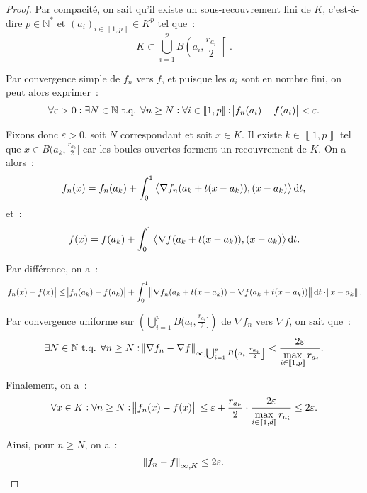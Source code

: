 \documentclass{report}
\theoremstyle{definition}
\theoremstyle{remark}
\numberwithin{equation}{section}
\newcommand{\N}{\mathbb N}
\newcommand{\tq}{\text{ t.q. }}
\newcommand{\intint}[2]{\left\llbracket#1, #2\right\rrbracket}
\newcommand{\scpr}[2]{\left\langle #1, #2\right\rangle}
\begin{document}
\begin{proof}
			Par compacité, on sait qu'il existe un sous-recouvrement fini de $K$, c'est-à-dire $p \in \N^*$ et $(a_i)_{i \in \intint 1p} \in K^p$ tel que~:
			\begin{equation}
				K \subset \bigcup_{i=1}^pB\left(a_i, \frac {r_{a_i}}2\right[.
			\end{equation}

			Par convergence simple de $f_n$ vers $f$, et puisque les $a_i$ sont en nombre fini, on peut alors exprimer~:
			\begin{equation}
				\forall \varepsilon > 0 : \exists N \in \N \tq \forall n \geq N : \forall i \in \intint 1p : \abs {f_n(a_i) - f(a_i)} < \varepsilon.
			\end{equation}

			Fixons donc $\varepsilon > 0$, soit $N$ correspondant et soit $x \in K$. Il existe $k \in \intint 1p$ tel que $x \in B(a_k, \frac {r_{a_k}}2[$ car
			les boules ouvertes forment un recouvrement de $K$. On a alors~:
			\begin{equation}
				f_n(x) = f_n(a_k) + \int_0^1\scpr {\nabla f_n(a_k + t(x - a_k))}{(x - a_k)}\dif t,
			\end{equation}
			et~:
			\begin{equation}
				f(x) = f(a_k) + \int_0^1\scpr {\nabla f(a_k + t(x - a_k))}{(x - a_k)}\dif t.
			\end{equation}

			Par différence, on a~:
			\begin{equation}
				\abs {f_n(x) - f(x)} \leq \abs {f_n(a_k) - f(a_k)} + \int_0^1\norm {\nabla f_n(a_k + t(x - a_k))
				- \nabla f(a_k + t(x - a_k))}\dif t \cdot \norm {x - a_k}.
			\end{equation}

			Par convergence uniforme sur $\left(\bigcup_{i=1}^pB(a_i, \frac {r_{a_i}}2]\right)$ de $\nabla f_n$ vers $\nabla f$, on sait que~:
			\begin{equation}
				\exists N \in \N \tq \forall n \geq N : \norm {\nabla f_n - \nabla f}_{\infty, \bigcup_{i=1}^pB\left(a_i, \frac {r_{a_i}}2\right]} <
				\frac {2\varepsilon}{\displaystyle \max_{i \in \intint 1p} r_{a_i}}.
			\end{equation}

			Finalement, on a~:
			\begin{equation}
				\forall x \in K : \forall n \geq N : \norm {f_n(x) - f(x)} \leq
				\varepsilon + \frac {r_{a_k}}{2} \cdot \frac {2\varepsilon}{\displaystyle \max_{i \in \intint 1d}r_{a_i}} \leq 2\varepsilon.
			\end{equation}

			Ainsi, pour $n \geq N$, on a~:
			\begin{equation}
				\norm {f_n - f}_{\infty, K} \leq 2\varepsilon.
			\end{equation}
			\end{proof}
\end{document}
